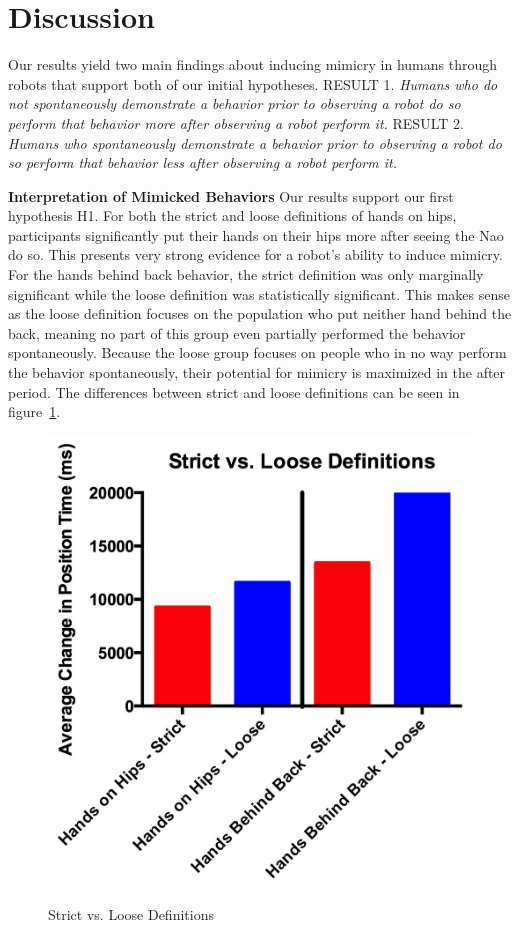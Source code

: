 \documentclass{acm_proc_article-sp}
\begin{document}
\section{Discussion}
Our results yield two main findings about inducing mimicry in humans through robots that support both of our initial hypotheses.
RESULT 1. \textit{Humans who do not spontaneously demonstrate a behavior prior to observing a robot do so perform that behavior more after observing a robot perform it.}
RESULT 2. \textit{Humans who spontaneously demonstrate a behavior prior to observing a robot do so perform that behavior less after observing a robot perform it.}

\textbf{Interpretation of Mimicked Behaviors} Our results support our first hypothesis H1. For both the strict and loose definitions of hands on hips, participants significantly put their hands on their hips more after seeing the Nao do so. This presents very strong evidence for a robot's ability to induce mimicry. For the hands behind back behavior, the strict definition was only marginally significant while the loose definition was statistically significant. This makes sense as the loose definition focuses on the population who put neither hand behind the back, meaning no part of this group even partially performed the behavior spontaneously. Because the loose group focuses on people who in no way perform the behavior spontaneously, their potential for mimicry is maximized in the after period. The differences between strict and loose definitions can be seen in figure~\ref{svl}.

\begin{figure}[t!]
\centering
 \includegraphics[width=0.85\linewidth]{images/svl.jpg}\\
 \caption{Strict vs. Loose Definitions}
 \label{svl} %
\end{figure}
\end{document}
